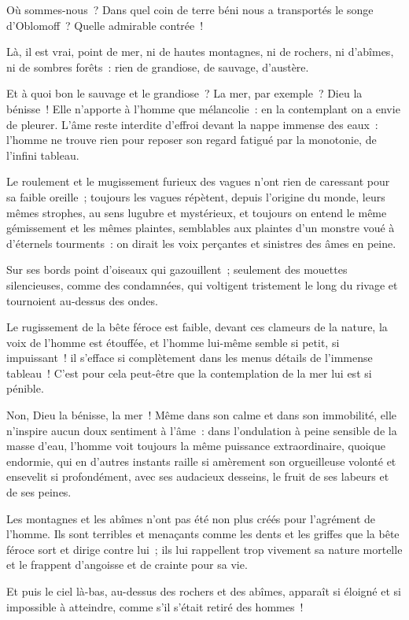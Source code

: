 \documentclass[french,twoside]{book} %
\begin{document}
\noindent Où sommes-nous ? Dans quel coin de terre béni nous a transportés le songe d’Oblomoff ? Quelle admirable contrée !\par
Là, il est vrai, point de mer, ni de hautes montagnes, ni de rochers, ni d’abîmes, ni de sombres forêts : rien de grandiose, de sauvage, d’austère.\par
Et à quoi bon le sauvage et le grandiose ? La mer, par exemple ? Dieu la bénisse ! Elle n’apporte à l’homme que mélancolie : en la contemplant on a envie de pleurer. L’âme reste interdite d’effroi devant la nappe immense des eaux : l’homme ne trouve rien pour reposer son regard fatigué par la monotonie, de l’infini tableau.\par
Le roulement et le mugissement furieux des vagues n’ont rien de caressant pour sa faible oreille ; toujours les vagues répètent, depuis l’origine du monde, leurs mêmes strophes, au sens lugubre et mystérieux, et toujours on entend le même gémissement et les mêmes plaintes, semblables aux plaintes d’un monstre voué à d’éternels tourments : on dirait les voix perçantes et sinistres des âmes en peine.\par
Sur ses bords point d’oiseaux qui gazouillent ; seulement des mouettes silencieuses, comme des condamnées, qui voltigent tristement le long du rivage et tournoient au-dessus des ondes.\par
Le rugissement de la bête féroce est faible, devant ces clameurs de la nature, la voix de l’homme est étouffée, et l’homme lui-même semble si petit, si impuissant ! il s’efface si complètement dans les menus détails de l’immense tableau ! C’est pour cela peut-être que la contemplation de la mer lui est si pénible.\par
Non, Dieu la bénisse, la mer ! Même dans son calme et dans son immobilité, elle n’inspire aucun doux sentiment à l’âme : dans l’ondulation à peine sensible de la masse d’eau, l’homme voit toujours la même puissance extraordinaire, quoique endormie, qui en d’autres instants raille si amèrement son orgueilleuse volonté et ensevelit si profondément, avec ses audacieux desseins, le fruit de ses labeurs et de ses peines.\par
Les montagnes et les abîmes n’ont pas été non plus créés pour l’agrément de l’homme. Ils sont terribles et menaçants comme les dents et les griffes que la bête féroce sort et dirige contre lui ; ils lui rappellent trop vivement sa nature mortelle et le frappent d’angoisse et de crainte pour sa vie.\par
Et puis le ciel là-bas, au-dessus des rochers et des abîmes, apparaît si éloigné et si impossible à atteindre, comme s’il s’était retiré des hommes !\par
\end{document}
